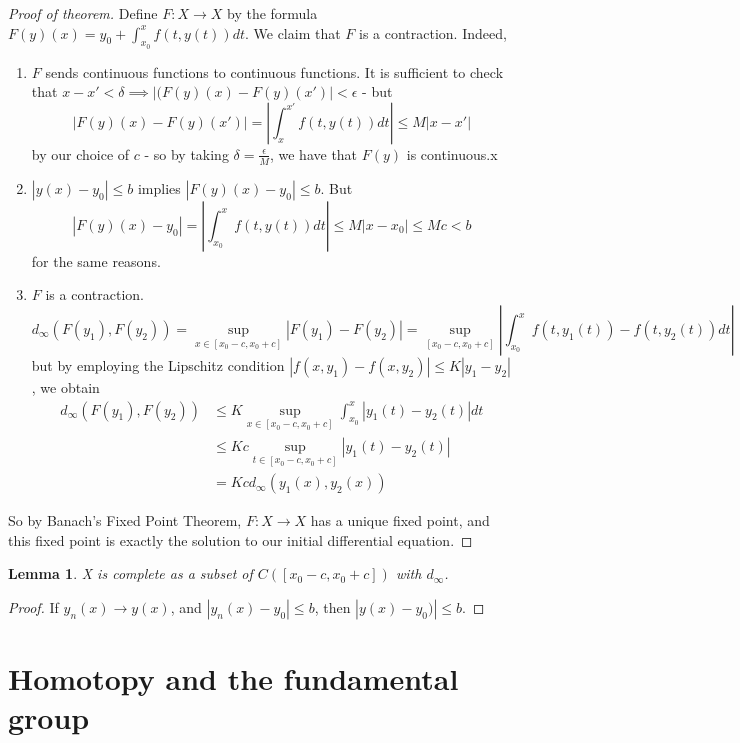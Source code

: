 \documentclass{article}
\theoremstyle{definition}
\theoremstyle{plain}%
\newtheorem{lem}[thm]{Lemma}
\theoremstyle{remark}
\begin{document}
\begin{proof}[Proof of theorem]
     Define $F : X \to X$ by the formula $F(y)(x) = y_0 + \int_{x_0}^x f(t, y(t)) dt$. We claim that $F$ is a contraction. Indeed,
     \begin{enumerate}
         \item $F$ sends continuous functions to continuous functions. It is sufficient to check that $x - x' < \delta \implies |(F(y)(x) - F(y)(x')| < \epsilon$ - but
         \[|F(y)(x) - F(y)(x')| = \left|\int_{x}^{x'} f(t, y(t)) dt\right| \le M|x - x'|\]
         by our choice of $c$ - so by taking $\delta = \frac{\epsilon}{M}$, we have that $F(y)$ is continuous.x
         \item $|y(x) - y_0| \le b$ implies $|F(y)(x) - y_0| \le b$. But
         \[|F(y)(x) - y_0| = \left|\int_{x_0}^x f(t, y(t)) dt \right| \le M|x - x_0| \le Mc < b\]
         for the same reasons.
         \item $F$ is a contraction.
         \[d_\infty(F(y_1), F(y_2)) = \sup_{x \in [x_0 - c, x_0 + c]} | F(y_1) - F(y_2)| = \sup_{[x_0 - c, x_0 + c]} \left| \int_{x_0}^x f(t, y_1(t)) - f(t, y_2(t)) dt \right| \]
         but by employing the Lipschitz condition $|f(x, y_1) - f(x, y_2)| \le K|y_1 - y_2|$, we obtain
         \begin{align*}
         d_\infty(F(y_1), F(y_2)) &\le K \sup_{x \in [x_0 - c, x_0 + c]} \int_{x_0}^{x} |y_1(t) - y_2(t)| dt \\
         &\le Kc\sup_{t \in [x_0 - c, x_0 + c]}|y_1(t) - y_2(t)| \\
         &= Kc d_\infty(y_1(x), y_2(x))
         \end{align*}
     \end{enumerate}
     So by Banach's Fixed Point Theorem, $F : X \to X$ has a unique fixed point, and this fixed point is exactly the solution to our initial differential equation.
\end{proof}

\begin{lem}
    X is complete as a subset of $C([x_0 - c, x_0 + c])$ with $d_\infty$.
\end{lem}

\begin{proof}
     If $y_n(x) \to y(x)$, and $|y_n(x) - y_0| \le b$, then $|y(x) - y_0)| \le b$.
\end{proof}

\section{Homotopy and the fundamental group}
\end{document}
